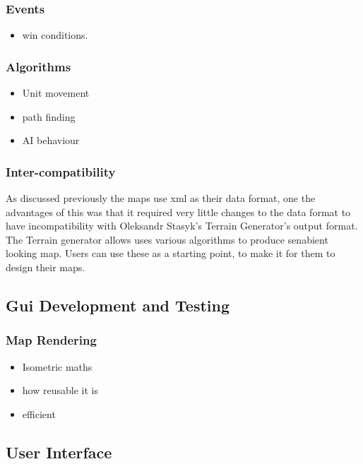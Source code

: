\subsubsection{Events}
\label{ssub:events}

\begin{itemize}
	\item win conditions.
\end{itemize}

\subsubsection{Algorithms}
\label{ssub:Algorithms}

\begin{itemize}
	\item Unit movement
	\item path finding
	\item AI behaviour
\end{itemize}

\subsubsection{Inter-compatibility}
\label{ssub:intercompatibility}
As discussed previously the maps use xml as their data format, one the advantages of this was that it required very little changes to the data format to have incompatibility with Oleksandr Stasyk's  Terrain Generator's output format.  The Terrain generator allows uses various algorithms to produce senabient looking map. Users can use these as a starting  point, to make it for them to design their maps.


\subsection{Gui Development and Testing}

\subsubsection{Map Rendering}
\label{ssub:map_rendering}

\begin{itemize}
	\item Isometric maths
	\item how reusable it is
	\item efficient 
\end{itemize}

\subsection{User Interface}

